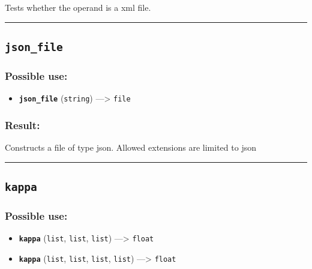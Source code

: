 \documentclass[]{book}
\providecommand{\tightlist}{%
  \setlength{\itemsep}{0pt}\setlength{\parskip}{0pt}}
\theoremstyle{definition}
\theoremstyle{definition}
\theoremstyle{definition}
\theoremstyle{remark}
\begin{document}
Tests whether the operand is a xml file.

\begin{center}\rule{0.5\linewidth}{\linethickness}\end{center}

\subsection{\texorpdfstring{\texttt{json\_file}}{json\_file}}\label{json_file}

\subsubsection{Possible use:}\label{possible-use-310}

\begin{itemize}
\tightlist
\item
  \textbf{\texttt{json\_file}} (\texttt{string}) ---\textgreater{}
  \texttt{file}
\end{itemize}

\subsubsection{Result:}\label{result-300}

Constructs a file of type json. Allowed extensions are limited to json

\begin{center}\rule{0.5\linewidth}{\linethickness}\end{center}

\subsection{\texorpdfstring{\texttt{kappa}}{kappa}}\label{kappa}

\subsubsection{Possible use:}\label{possible-use-311}

\begin{itemize}
\tightlist
\item
  \textbf{\texttt{kappa}} (\texttt{list}, \texttt{list}, \texttt{list})
  ---\textgreater{} \texttt{float}
\item
  \textbf{\texttt{kappa}} (\texttt{list}, \texttt{list}, \texttt{list},
  \texttt{list}) ---\textgreater{} \texttt{float}
\end{itemize}
\end{document}
